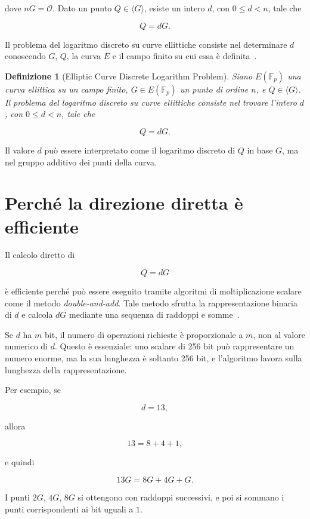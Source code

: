 \documentclass[12pt,a4paper,oneside]{report}
\newtheorem{definition}{Definizione}[chapter]
\begin{document}
dove \(nG=\mathcal{O}\). Dato un punto \(Q \in \langle G \rangle\), esiste un intero \(d\), con \(0 \leq d < n\), tale che

\begin{equation}
    Q = dG.
\end{equation}

Il problema del logaritmo discreto su curve ellittiche consiste nel determinare \(d\) conoscendo \(G\), \(Q\), la curva \(E\) e il campo finito su cui essa è definita~\cite{margara_ec,sec1}.

\begin{definition}[Elliptic Curve Discrete Logarithm Problem]
Siano \(E(\mathbb{F}_p)\) una curva ellittica su un campo finito, \(G\in E(\mathbb{F}_p)\) un punto di ordine \(n\), e \(Q\in \langle G\rangle\). Il problema del logaritmo discreto su curve ellittiche consiste nel trovare l'intero \(d\), con \(0 \leq d < n\), tale che

\[
Q=dG.
\]
\end{definition}

Il valore \(d\) può essere interpretato come il logaritmo discreto di \(Q\) in base \(G\), ma nel gruppo additivo dei punti della curva.

\section{Perché la direzione diretta è efficiente}

Il calcolo diretto di

\[
Q=dG
\]

è efficiente perché può essere eseguito tramite algoritmi di moltiplicazione scalare come il metodo \textit{double-and-add}. Tale metodo sfrutta la rappresentazione binaria di \(d\) e calcola \(dG\) mediante una sequenza di raddoppi e somme~\cite{sec1}.

Se \(d\) ha \(m\) bit, il numero di operazioni richieste è proporzionale a \(m\), non al valore numerico di \(d\). Questo è essenziale: uno scalare di 256 bit può rappresentare un numero enorme, ma la sua lunghezza è soltanto 256 bit, e l'algoritmo lavora sulla lunghezza della rappresentazione.

Per esempio, se

\[
d = 13,
\]

allora

\[
13 = 8+4+1,
\]

e quindi

\[
13G = 8G + 4G + G.
\]

I punti \(2G\), \(4G\), \(8G\) si ottengono con raddoppi successivi, e poi si sommano i punti corrispondenti ai bit uguali a \(1\).
\end{document}

